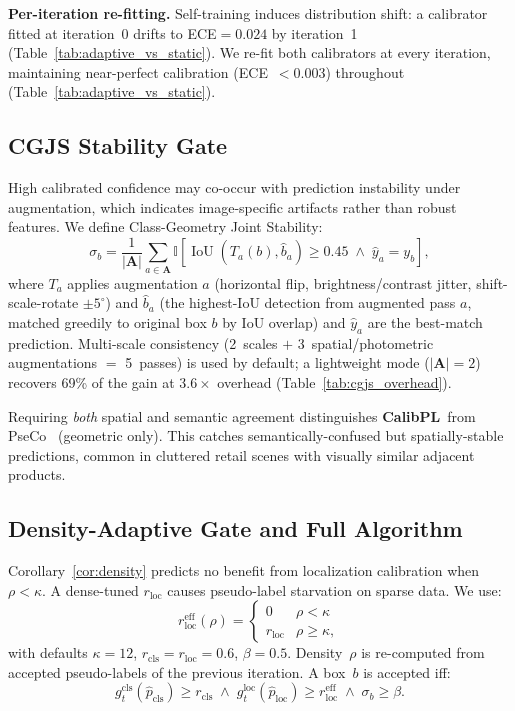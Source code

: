 \documentclass[10pt,twocolumn,letterpaper]{article}
\newcommand{\method}{\textbf{CalibPL}\xspace}
\begin{document}
\textbf{Per-iteration re-fitting.}
Self-training induces distribution shift: a calibrator fitted at iteration~0
drifts to ECE${=}0.024$ by iteration~1
(Table~\ref{tab:adaptive_vs_static}). We re-fit both calibrators at every
iteration, maintaining near-perfect calibration
(ECE~${<}0.003$) throughout (Table~\ref{tab:adaptive_vs_static}).

\subsection{CGJS Stability Gate}
\label{sec:cgjs}

High calibrated confidence may co-occur with prediction instability under
augmentation, which indicates image-specific artifacts rather than robust
features. We define Class-Geometry Joint Stability:
\begin{equation}
\label{eq:cgjs}
\sigma_b = \frac{1}{|\mathbf{A}|}\sum_{a\in\mathbf{A}} \mathbb{I}\!\left[\operatorname{IoU}(T_a(b),\hat{b}_a){\ge}0.45 \;\wedge\; \hat{y}_a{=}y_b\right],
\end{equation}
where $T_a$ applies augmentation $a$ (horizontal flip, brightness/contrast
jitter, shift-scale-rotate ${\pm}5^\circ$) and $\hat{b}_a$ (the highest-IoU detection from augmented pass $a$,
matched greedily to original box $b$ by IoU overlap) and $\hat{y}_a$ are the
best-match prediction. Multi-scale consistency (2~scales $+$ 3~spatial/photometric
augmentations $=$ 5~passes) is used by default; a lightweight mode
($|\mathbf{A}|{=}2$) recovers 69\% of the gain at $3.6{\times}$ overhead
(Table~\ref{tab:cgjs_overhead}).

Requiring \emph{both} spatial and semantic agreement distinguishes \method\
from PseCo~\cite{pseco2022} (geometric only). This catches semantically-confused
but spatially-stable predictions, common in cluttered retail scenes with
visually similar adjacent products.

\subsection{Density-Adaptive Gate and Full Algorithm}
\label{sec:density_adaptive}

Corollary~\ref{cor:density} predicts no benefit from localization calibration
when $\rho{<}\kappa$. A dense-tuned $r_\text{loc}$ causes pseudo-label
starvation on sparse data. We use:
\[
r_\text{loc}^\text{eff}(\rho) = \begin{cases} 0 & \rho < \kappa \\ r_\text{loc} & \rho \ge \kappa, \end{cases}
\]
with defaults $\kappa{=}12$, $r_\text{cls}{=}r_\text{loc}{=}0.6$, $\beta{=}0.5$.
Density~$\rho$ is re-computed from accepted pseudo-labels of the previous
iteration. A box~$b$ is accepted iff:
\begin{equation}
\label{eq:gate}
g_t^\text{cls}(\hat{p}_\text{cls}) \ge r_\text{cls}
\;\wedge\;
g_t^\text{loc}(\hat{p}_\text{loc}) \ge r_\text{loc}^\text{eff}
\;\wedge\;
\sigma_b \ge \beta.
\end{equation}
\end{document}

